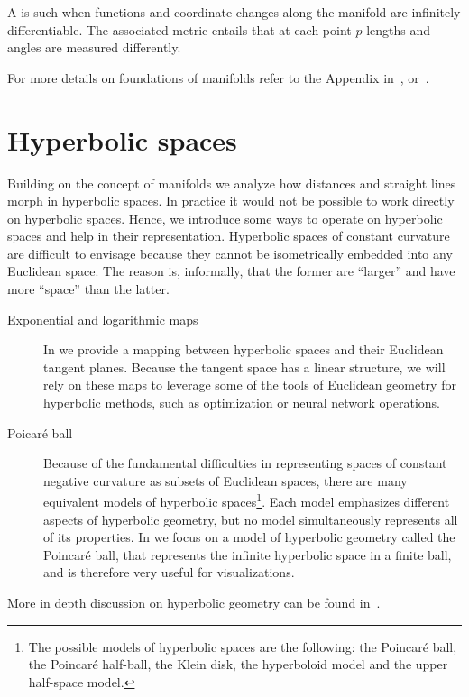 A  is such when functions and coordinate changes along the manifold are infinitely differentiable. The associated metric entails that at each point $p$ lengths and angles are measured differently.

For more details on foundations of manifolds refer to the Appendix in~\cite{Chami2021representationLearningAlgorithmsHyperbolicSpaces}, or~\cite{doCarmo1992riemannianGeometry}\cite{Lee2003smooth}.


\section{Hyperbolic spaces}
Building on the concept of manifolds we analyze how distances and straight lines morph in hyperbolic spaces. In practice it would not be possible to work directly on hyperbolic spaces. Hence, we introduce some ways to operate on hyperbolic spaces and help in their representation. Hyperbolic spaces of constant curvature are difficult to envisage because they cannot be
isometrically embedded into any Euclidean space. The reason is, informally, that the former are ``larger'' and have more ``space'' than the latter.
\begin{description}
    \item[Exponential and logarithmic maps] In  we provide a mapping between hyperbolic spaces and their Euclidean tangent planes. Because the tangent space has a linear structure, we will rely on these maps to leverage some of the tools of Euclidean geometry for hyperbolic methods, such as optimization or neural network operations.
    \item[Poicaré ball] Because of the fundamental difficulties in representing spaces of constant negative curvature as subsets of Euclidean spaces, there are many equivalent models of hyperbolic spaces\footnote{The possible models of hyperbolic spaces are the following: the Poincaré ball, the Poincaré half-ball, the Klein disk, the hyperboloid model and the upper half-space model.}. Each model emphasizes different aspects of hyperbolic geometry, but no model simultaneously represents all of its properties. In  we focus on a model of hyperbolic geometry called the Poincaré ball, that represents the infinite hyperbolic space in a finite ball, and is therefore very useful for visualizations. 
\end{description}

More in depth discussion on hyperbolic geometry can be found in~\cite{Anderson2006hyperbolicGeometry}\cite{Ramsay2013introductionHyperbolicGeometry}.

